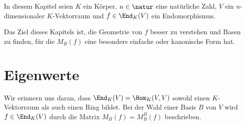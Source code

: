 In diesem Kapitel seien $K$ ein Körper, $n\in\natur$ eine natürliche Zahl, $V$ ein $n$-dimensionaler $K$-Vektorraum und $f\in\End_K(V)$ ein Endomorphismus.

Das Ziel dieses Kapitels ist, die Geometrie von $f$ besser zu verstehen und Basen zu finden, für die $M_B(f)$ eine besonders einfache oder kanonische Form hat.

\section{Eigenwerte}

\begin{remark}
	Wir erinnern uns daran, dass $\End_K(V)=\Hom_K(V,V)$ sowohl einen $K$-Vektorraum als auch einen Ring bildet. Bei der Wahl einer Basis $B$ von $V$ wird $f\in\End_K(V)$ durch die Matrix $M_B(f)=M_B^B(f)$ beschrieben.	
\end{remark}

